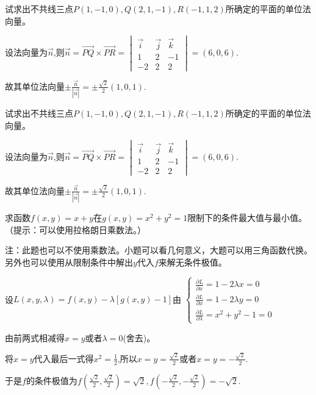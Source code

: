 \documentclass[addtable,answer,twoside,12pt]{hnuexam}
\begin{document}
\begin{questions}
\question[9]
试求出不共线三点$P(1,-1,0),Q(2,1,-1),R(-1,1,2)$所确定的平面的单位法向量。
\begin{solution}
设法向量为$\vec{n}$,则$\vec{n}=\vec{PQ}\times\vec{PR}=
\begin{vmatrix}
	\vec{i} & \vec{j} & \vec{k} \\
	1       & 2       & -1      \\
	-2      & 2       & 2
\end{vmatrix}=(6,0,6).$

故其单位法向量$\pm\frac{\vec{n}}{|\vec{n}|}=\pm\frac{\sqrt{2}}{2}(1,0,1).$
\end{solution}

\question[9]
试求出不共线三点$P(1,-1,0),Q(2,1,-1),R(-1,1,2)$所确定的平面的单位法向量。
\begin{solution}
设法向量为$\vec{n}$,则$\vec{n}=\vec{PQ}\times\vec{PR}=
\begin{vmatrix}
	\vec{i} & \vec{j} & \vec{k} \\
	1       & 2       & -1      \\
	-2      & 2       & 2
\end{vmatrix}=(6,0,6).$
	
故其单位法向量$\pm\frac{\vec{n}}{|\vec{n}|}=\pm\frac{\sqrt{2}}{2}(1,0,1).$
\end{solution}
\clearpage

\question[10]
求函数$f(x,y)=x+y$在$g(x,y)=x^2+y^2=1$限制下的条件最大值与最小值。（提示：可以使用拉格朗日乘数法。）
\begin{solution}
注：此题也可以不使用乘数法。小题可以看几何意义，大题可以用三角函数代换。另外也可以使用从限制条件中解出$y$代入$f$来解无条件极值。

设$L(x,y,\lambda)=f(x,y)-\lambda [g(x,y)-1]$由
$\begin{cases}
	\frac{\partial L}{\partial x}=1-2\lambda x=0 \\
	\frac{\partial L}{\partial x}=1-2\lambda y=0 \\
	\frac{\partial L}{\partial \lambda}=x^2+y^2-1=0
\end{cases}$

由前两式相减得$x=y$或者$\lambda=0$(舍去)。

将$x=y$代入最后一式得$x^2=\frac{1}{2}$,所以$x=y=\frac{\sqrt{2}}{2}$或者$x=y=-\frac{\sqrt{2}}{2}$.

于是$f$的条件极值为$f(\frac{\sqrt{2}}{2},\frac{\sqrt{2}}{2})=\sqrt{2},f(-\frac{\sqrt{2}}{2},-\frac{\sqrt{2}}{2})=-\sqrt{2}.$


\end{solution}
\end{questions}
\end{document}
